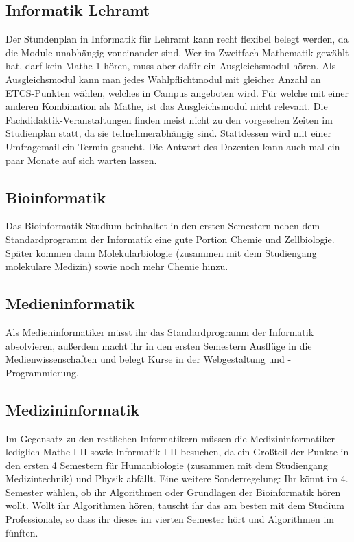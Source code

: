 \subsection*{Informatik Lehramt}
	
\pagebreak 
Der Stundenplan in Informatik für Lehramt kann recht flexibel belegt werden, da die Module unabhängig voneinander sind. Wer im Zweitfach Mathematik gewählt hat, darf kein Mathe 1 hören, muss aber dafür ein Ausgleichsmodul hören. Als Ausgleichsmodul kann man jedes Wahlpflichtmodul mit gleicher Anzahl an ETCS-Punkten wählen, welches in Campus angeboten wird. Für welche mit einer anderen Kombination als Mathe, ist das Ausgleichsmodul nicht relevant. Die Fachdidaktik-Veranstaltungen finden meist nicht zu den vorgesehen Zeiten im Studienplan statt, da sie teilnehmerabhängig sind. Stattdessen wird mit einer Umfragemail ein Termin gesucht. Die Antwort des Dozenten kann auch mal ein paar Monate auf sich warten lassen.

\subsection*{Bioinformatik}
	
Das Bioinformatik-Studium beinhaltet in den ersten Semestern neben dem Standardprogramm der Informatik eine gute Portion Chemie und Zellbiologie. Später kommen dann Molekularbiologie (zusammen mit dem Studiengang molekulare Medizin) sowie noch mehr Chemie hinzu.
\pagebreak 
\subsection*{Medieninformatik}
	
Als Medieninformatiker müsst ihr das Standardprogramm der Informatik absolvieren, außerdem macht ihr in den ersten Semestern Ausflüge in die Medienwissenschaften und belegt Kurse in der Webgestaltung und -Programmierung.
\subsection*{Medizininformatik}
	
Im Gegensatz zu den restlichen Informatikern müssen die Medizininformatiker lediglich Mathe I-II sowie Informatik I-II besuchen, da ein Großteil der Punkte in den ersten 4 Semestern für Humanbiologie (zusammen mit dem Studiengang Medizintechnik) und Physik abfällt. Eine weitere Sonderregelung: Ihr könnt im 4. Semester wählen, ob ihr Algorithmen oder Grundlagen der Bioinformatik hören wollt. Wollt ihr Algorithmen hören, tauscht ihr das am besten mit dem Studium Professionale, so dass ihr dieses im vierten Semester hört und Algorithmen im fünften.

\pagebreak